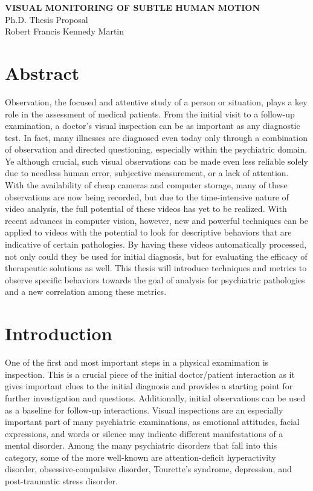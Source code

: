 \documentclass[11pt]{article}
\begin{document}

%
\newpage
\thispagestyle{empty}
\begin{center}
\textbf{VISUAL MONITORING OF SUBTLE HUMAN MOTION}\\
Ph.D. Thesis Proposal\\
\bigskip
Robert Francis Kennedy Martin\\
\end{center}
\clearpage
{}
\section{Abstract}
\noindent
Observation, the focused and attentive study of a person or situation, plays a key role in the assessment of medical patients. From the initial visit to a follow-up examination, a doctor's visual inspection can be as important as any diagnostic test. In fact, many illnesses are diagnosed even today only through a combination of observation and directed questioning, especially within the psychiatric domain. Ye although crucial, such visual observations can be made even less reliable solely due to needless human error, subjective measurement, or a lack of attention. With the availability of cheap cameras and computer storage, many of these observations are now being recorded, but due to the time-intensive nature of video analysis, the full potential of these videos has yet to be realized. With recent advances in computer vision, however, new and powerful techniques can be applied to videos with the potential to look for descriptive behaviors that are indicative of certain pathologies. By having these videos automatically processed, not only could they be used for initial diagnosis, but for evaluating the efficacy of therapeutic solutions as well. This thesis will introduce techniques and metrics to observe specific behaviors towards the goal of analysis for psychiatric pathologies and a new correlation among these metrics.
\section{Introduction}
\noindent
One of the first and most important steps in a physical examimation is inspection. This is a crucial piece of the initial doctor/patient interaction as it gives important clues to the initial diagnosis and provides a starting point for further investigation and questions. Additionally, initial observations can be used as a baseline for follow-up interactions. Visual inspections are an especially important part of many psychiatric examinations, as emotional attitudes, facial expressions, and words or silence may indicate different manifestations of a mental disorder. Among the many psychiatric disorders that fall into this category, some of the more well-known are attention-deficit hyperactivity disorder, obsessive-compulsive disorder, Tourette's syndrome, depression, and post-traumatic stress disorder.
\end{document}
